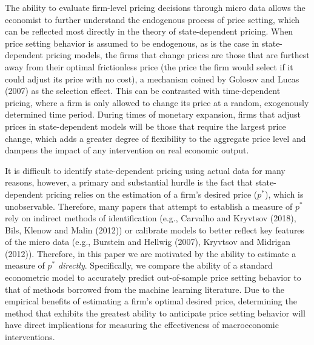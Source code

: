 \documentclass[11pt]{article}
\begin{document}
The ability to evaluate firm-level pricing decisions through micro data allows the economist to further understand the endogenous process of price setting, which can be reflected most directly in the theory of state-dependent pricing. When price  setting  behavior  is  assumed  to  be  endogenous, as is the case  in  state-dependent pricing models,  the  firms  that  change  prices  are  those  that  are  furthest  away  from  their  optimal  frictionless  price  (the  price  the  firm  would  select  if  it  could  adjust  its  price  with  no  cost),  a  mechanism  coined  by  Golosov  and  Lucas  (2007) as  the  selection  effect. This can be contrasted with time-dependent pricing, where a firm is only allowed to change its price at a random, exogenously determined time period.  During  times  of  monetary  expansion,  firms  that  adjust  prices  in state-dependent models will  be  those  that  require  the  largest  price  change,  which  adds  a  greater  degree  of  flexibility  to  the  aggregate  price  level  and  dampens  the  impact  of  any  intervention  on  real  economic  output. 

It is difficult to identify state-dependent pricing using actual data for many reasons, however, a primary and substantial hurdle is the fact that state-dependent pricing relies on the estimation of a firm's desired price ($p^*$), which is unobservable. Therefore, many papers that attempt to establish a measure of $p^*$ rely on indirect methods of identification (e.g., Carvalho and Kryvtsov (2018), Bils, Klenow and Malin (2012)) or calibrate models to better reflect key features of the micro data (e.g., Burstein and Hellwig (2007), Kryvtsov and Midrigan (2012)). Therefore, in this paper we are motivated by the ability to estimate a measure of $p^*$ \textit{directly}. Specifically, we compare the ability of a standard econometric model to accurately predict out-of-sample price setting behavior to that of methods borrowed from the machine learning literature. Due to the empirical benefits of estimating a firm's optimal desired price, determining the method that exhibits the greatest ability to anticipate price setting behavior will have direct implications for measuring the effectiveness of macroeconomic interventions.  
\end{document}
